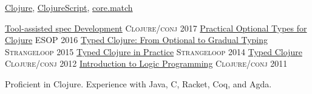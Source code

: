 \documentclass[10pt,a4paper]{article}
\begin{document}
%
\bodytext
  {\href{https://github.com/clojure/clojure/commits?author=frenchy64}{Clojure},
   \href{https://github.com/clojure/clojurescript/commits?author=frenchy64}{ClojureScript},
   \href{https://github.com/clojure/core.match/commits?author=frenchy64}{core.match}
   }



\headedsection
  {\href{https://www.youtube.com/watch?v=kcZVkvO1Dpo}{Tool-assisted spec Development}}
  {\textsc{Clojure/conj 2017}} {%
}
\headedsection
  {\href{http://ambrosebs.com/talks/esop16.pdf}{Practical Optional Types for Clojure}}
  {\textsc{ESOP 2016}} {%
  }
\headedsection
  {\href{https://www.youtube.com/watch?v=yG9CffLlXx0}{Typed Clojure: From Optional to Gradual Typing}}
  {\textsc{Strangeloop 2015}} {%
}
\headedsection
  {\href{https://www.youtube.com/watch?v=a0gT0syAXsY}{Typed Clojure in Practice}}
  {\textsc{Strangeloop 2014}} {%
}
\headedsection
  {\href{https://www.youtube.com/watch?v=a0gT0syAXsY}{Typed Clojure}}
  {\textsc{Clojure/conj 2012}} {%
}
\headedsection
  {\href{https://www.youtube.com/watch?v=irjP8BO1B8Y}{Introduction to Logic Programming}}
  {\textsc{Clojure/conj 2011}} {%
}


\bodytext
  {
        Proficient in Clojure. Experience with Java, C, Racket, Coq, and Agda.
        }
\end{document}

